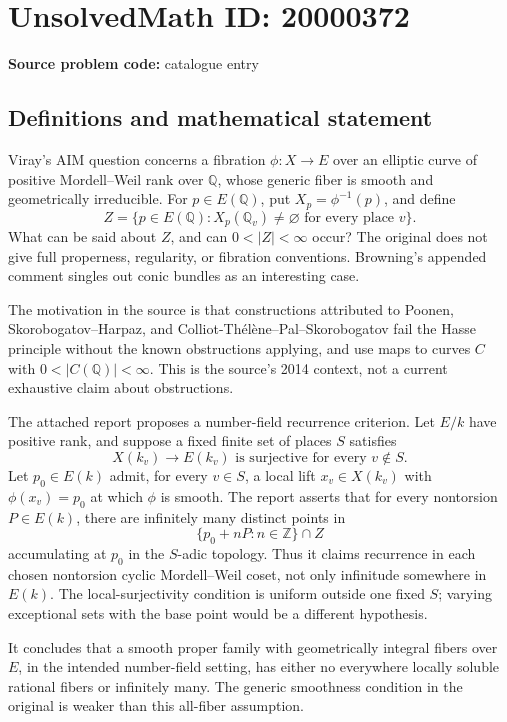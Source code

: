\documentclass[11pt]{article}
\newcommand{\Z}{\mathbb{Z}}
\newcommand{\Q}{\mathbb{Q}}
\begin{document}
\section*{UnsolvedMath ID: 20000372}
\textbf{Source problem code:} catalogue entry
\subsection{Definitions and mathematical statement}
Viray's AIM question concerns a fibration \(\phi:X\to E\) over an elliptic curve of positive Mordell--Weil rank over \(\Q\), whose generic fiber is smooth and geometrically irreducible. For \(p\in E(\Q)\), put \(X_p=\phi^{-1}(p)\), and define
\[
Z=\{p\in E(\Q):X_p(\Q_v)\ne\varnothing\text{ for every place }v\}.
\]
What can be said about \(Z\), and can \(0<|Z|<\infty\) occur? The original does not give full properness, regularity, or fibration conventions. Browning's appended comment singles out conic bundles as an interesting case.

The motivation in the source is that constructions attributed to Poonen, Skorobogatov--Harpaz, and Colliot-Th\'el\`ene--Pal--Skorobogatov fail the Hasse principle without the known obstructions applying, and use maps to curves \(C\) with \(0<|C(\Q)|<\infty\). This is the source's 2014 context, not a current exhaustive claim about obstructions.

The attached report proposes a number-field recurrence criterion. Let \(E/k\) have positive rank, and suppose a fixed finite set of places \(S\) satisfies
\[
X(k_v)\longrightarrow E(k_v)\text{ is surjective for every }v\notin S.
\]
Let \(p_0\in E(k)\) admit, for every \(v\in S\), a local lift \(x_v\in X(k_v)\) with \(\phi(x_v)=p_0\) at which \(\phi\) is smooth. The report asserts that for every nontorsion \(P\in E(k)\), there are infinitely many distinct points in
\[
\{p_0+nP:n\in\Z\}\cap Z
\]
accumulating at \(p_0\) in the \(S\)-adic topology. Thus it claims recurrence in each chosen nontorsion cyclic Mordell--Weil coset, not only infinitude somewhere in \(E(k)\). The local-surjectivity condition is uniform outside one fixed \(S\); varying exceptional sets with the base point would be a different hypothesis.

It concludes that a smooth proper family with geometrically integral fibers over \(E\), in the intended number-field setting, has either no everywhere locally soluble rational fibers or infinitely many. The generic smoothness condition in the original is weaker than this all-fiber assumption.
\end{document}
